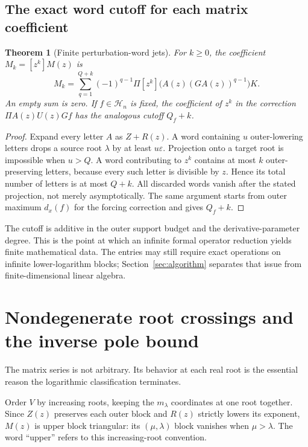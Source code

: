 \documentclass[11pt,a4paper]{article}
\numberwithin{equation}{section}
\newtheorem{theorem}{Theorem}[section]
\theoremstyle{definition}
\theoremstyle{remark}
\theoremstyle{definition}
\newcommand{\Hh}{\mathcal H}
\newcommand{\dx}{d_x}
\newcommand{\eps}{\varepsilon}
\newcommand{\coef}[2]{[#1]#2}
\begin{document}
\subsection{The exact word cutoff for each matrix coefficient}
\begin{theorem}[Finite perturbation-word jets]
\label{thm:wordcutoff}
For $k\ge0$, the coefficient $M_k=\coef{z^k}{M(z)}$ is
\begin{equation}
 M_k=\sum_{q=1}^{Q+k}(-1)^{q-1}
 \Pi\coef{z^k}{\bigl(A(z)(GA(z))^{q-1}\bigr)}K.
 \label{eq:jet-word}
\end{equation}
An empty sum is zero. If $f\in\Hh_n$ is fixed, the coefficient of $z^k$ in the correction $\Pi A(z)U(z)Gf$ has the analogous cutoff $Q_f+k$.
\end{theorem}
\begin{proof}
Expand every letter $A$ as $Z+R(z)$. A word containing $u$ outer-lowering letters drops a source root $\lambda$ by at least $u\eps$. Projection onto a target root is impossible when $u>Q$. A word contributing to $z^k$ contains at most $k$ outer-preserving letters, because every such letter is divisible by $z$. Hence its total number of letters is at most $Q+k$. All discarded words vanish after the stated projection, not merely asymptotically. The same argument starts from outer maximum $\dx(f)$ for the forcing correction and gives $Q_f+k$.
\end{proof}

The cutoff is additive in the outer support budget and the derivative-parameter degree. This is the point at which an infinite formal operator reduction yields finite mathematical data. The entries may still require exact operations on infinite lower-logarithm blocks; Section~\ref{sec:algorithm} separates that issue from finite-dimensional linear algebra.

\section{Nondegenerate root crossings and the inverse pole bound}
\label{sec:crossing}
The matrix series is not arbitrary. Its behavior at each real root is the essential reason the logarithmic classification terminates.

Order $V$ by increasing roots, keeping the $m_\lambda$ coordinates at one root together. Since $Z(z)$ preserves each outer block and $R(z)$ strictly lowers its exponent, $M(z)$ is upper block triangular: its $(\mu,\lambda)$ block vanishes when $\mu>\lambda$. The word ``upper'' refers to this increasing-root convention.
\end{document}
